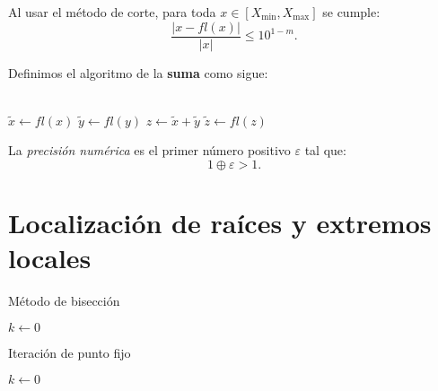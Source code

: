 \documentclass[8pt,a4paper]{extarticle}
\begin{document}
\begin{multicols}{3}
	\begin{boxtheo}[]
		Al usar el método de corte, para toda $x \in \left[ X_{\min}, X_{\max} \right]$ se cumple:
		\[
			\frac{\left| x - fl(x) \right| }{ \left| x \right|  } \le 10^{1 - m}
			.\]
	\end{boxtheo}

	\begin{boxdef}
		Definimos el algoritmo de la \textbf{suma} como sigue:
		\\
		\\
		\begin{algorithm}[H]
			$\tilde{x} \longleftarrow fl(x)$\;
			$\tilde{y} \longleftarrow fl(y)$\;
			$z \longleftarrow \tilde{x} + \tilde{y}$\;
			$\tilde{z} \longleftarrow fl(z)$
		\end{algorithm}
	\end{boxdef}

	\begin{boxdef}
		La \emph{precisión numérica} es el primer número positivo $\varepsilon$ tal que:
		\[
			1 \oplus \varepsilon > 1
			.\]
	\end{boxdef}

	\newpage

	\section{Localización de raíces y extremos locales}

	\begin{algorithm}[H]
		\caption{Método de bisección}
		$k \longleftarrow 0$\;
	\end{algorithm}

	\vspace{1cm}

	\begin{algorithm}[H]
		\caption{Iteración de punto fijo}
		$k \longleftarrow 0$\;
	\end{algorithm}


\end{multicols}
\end{document}
